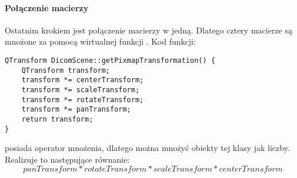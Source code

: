 \paragraph{Połączenie macierzy}
\par
Ostatnim krokiem jest połączenie macierzy w jedną.
Dlatego cztery macierze są mnożone za pomocą wirtualnej funkcji .
Kod funkcji:
\begin{lstlisting}
QTransform DicomScene::getPixmapTransformation() {
	QTransform transform;
	transform *= centerTransform;
	transform *= scaleTransform;
	transform *= rotateTransform;
	transform *= panTransform;
	return transform;
}
\end{lstlisting}
 posiada operator mnożenia, dlatego można mnożyć obiekty tej klasy jak liczby.
Realizuje to następujące równanie:
\[panTransform*rotateTransform*scaleTransform*centerTransform\]
